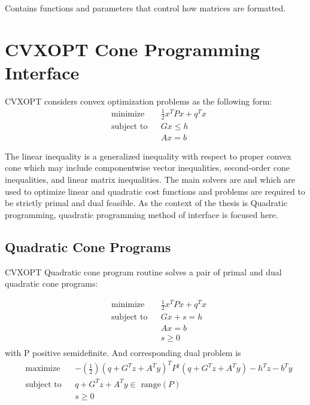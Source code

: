 \subsubsection*{}
Contains functions and parameters that control how matrices are formatted.

\section{CVXOPT Cone Programming Interface}
CVXOPT considers convex optimization problems as the following form:
\begin{equation*}
\begin{aligned}
& \text{minimize}
& & \frac{1}{2}x^{T}Px+q^{T}x \\
& \text{subject to} & &  Gx \leqslant h\\
& & &  Ax = b
\end{aligned}
\end{equation*}

The linear inequality is a generalized inequality with respect to proper convex cone which may include componentwise vector inequalities, second-order cone inequalities, and linear matrix inequalities. The main solvers are  and which are used to optimize linear and quadratic cost functions and problems are required to be strictly primal and dual feasible. As the context of the thesis is Quadratic programming, quadratic programming method of  interface is focused here.

\subsection{Quadratic Cone Programs}
CVXOPT Quadratic cone program routine solves a pair of primal and dual quadratic cone programs:

\begin{equation}
\begin{aligned}
& \text{minimize}
& & \frac{1}{2}x^{T}Px+q^{T}x \\
& \text{subject to} & &  Gx + s = h\\
& & &  Ax = b\\
& & &  s\geqslant 0\\
\end{aligned}
\label{eqn:CVXOPT_qp_1}
\end{equation}
with P positive semidefinite. And corresponding dual problem is
\begin{equation}
	\begin{aligned}
		& \text{maximize}
& & -(\frac{1}{2})(q+G^Tz+A^Ty)^{T}P^{\dagger}(q+G^Tz+A^Ty)-h^Tz-b^Ty\\
& \text{subject to} & &  q+G^Tz+A^Ty \in \text{ range}(P)\\
& & &  s\geqslant 0\\
	\end{aligned}
	\label{eqn:CVXOPT_qp_2}
\end{equation}

